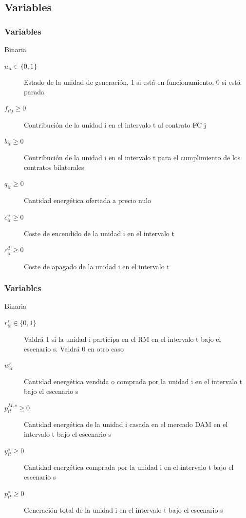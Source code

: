 \documentclass[xcolor=dvipsnames, utf8, spanish]{beamer} %
\begin{document}
\subsection{Variables}

\begin{frame}
	\frametitle{Variables}
	 {
		\begin{alertblock} {Binaria}
			\begin{description}
				\item [$u_{it}\in \{0,1\}$] Estado de la unidad de generación, 1 si está en funcionamiento, 0 si está 	parada
			\end{description}
		\end{alertblock}}
	 {
		\begin{description}
			\item [$f_{itj}\geq 0$] Contribución de la unidad i en el intervalo t al contrato FC j
			\item [$b_{it}\geq 0$] Contribución de la unidad i en el intervalo t para el cumplimiento de los contratos 	bilaterales
			\item [$q_{it}\geq 0$] Cantidad energética ofertada a precio nulo
			\item [$c_{it}^u\geq 0$] Coste de encendido de la unidad i en el intervalo t
			\item [$c_{it}^d\geq 0$] Coste de apagado de la unidad i en el intervalo t
		\end{description}}
\end{frame}


\begin{frame}[shrink]
	\frametitle{Variables}
	 {
		\begin{alertblock} {Binaria}
			\begin{description}
				\item [$r^{s}_{it}\in \{0,1\}$]  Valdrá 1 si la unidad i participa en el RM en el intervalo t bajo el escenario s. Valdrá 0 en otro caso
			\end{description}
		\end{alertblock}}
	 {
		\begin{description}
			\item [$w^{s}_{it}$] Cantidad energética vendida o comprada por la unidad i en el intervalo t bajo el 	escenario s
			\item [$p^{M,s}_{it}\geq 0$] Cantidad energética de la unidad i casada en el mercado DAM en el intervalo t 	bajo el escenario s		
			\item [$y^{s}_{it}\geq 0$] Cantidad energética comprada por la unidad i en el intervalo t bajo el escenario s
			\item [$p^{s}_{it}\geq 0$] Generación total de la unidad i en el intervalo t bajo el escenario s
		\end{description}}
\end{frame}
\end{document}
